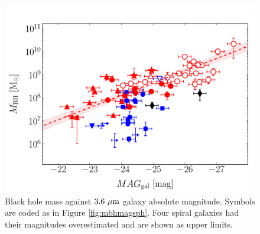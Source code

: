 \documentclass[preprint2]{emulateapj}
\begin{document}
\begin{figure}[h]
\begin{center}
\includegraphics[width=\columnwidth]{images/mbh_vs_mag_tot.pdf}
\caption{Black hole mass against $3.6\rm~\mu m$ galaxy absolute magnitude. 
Symbols are coded as in Figure \ref{fig:mbhmagsph}.
Four spiral galaxies had their magnitudes overestimated and are shown as upper limits. 
}
\label{fig:}
\end{center}
\end{figure}
\end{document}
